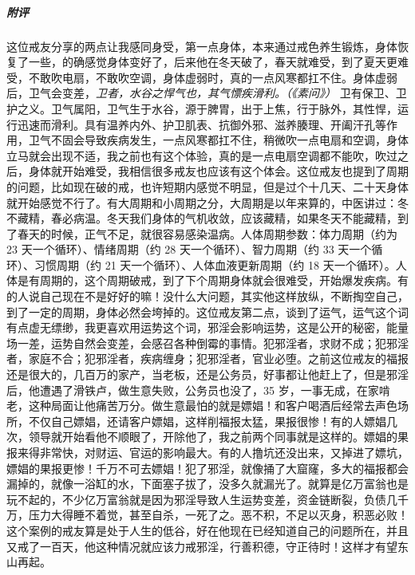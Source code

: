 \begin{case}
    \subparagraph{附评} 这位戒友分享的两点让我感同身受，第一点身体，本来通过戒色养生锻炼，身体恢复了一些，的确感觉身体变好了，后来他在冬天破了，春天就难受，到了夏天更难受，不敢吹电扇，不敢吹空调，身体虚弱时，真的一点风寒都扛不住。身体虚弱后，卫气会变差，\textit{卫者，水谷之悍气也，其气慓疾滑利。（《素问》）} 卫有保卫、卫护之义。卫气属阳，卫气生于水谷，源于脾胃，出于上焦，行于脉外，其性悍，运行迅速而滑利。具有温养内外、护卫肌表、抗御外邪、滋养腠理、开阖汗孔等作用，卫气不固会导致疾病发生，一点风寒都扛不住，稍微吹一点电扇和空调，身体立马就会出现不适，我之前也有这个体验，真的是一点电扇空调都不能吹，吹过之后，身体就开始难受，我相信很多戒友也应该有这个体会。这位戒友也提到了周期的问题，比如现在破的戒，也许短期内感觉不明显，但是过个十几天、二十天身体就开始感觉不行了。有大周期和小周期之分，大周期是以年来算的，中医讲过：冬不藏精，春必病温。冬天我们身体的气机收敛，应该藏精，如果冬天不能藏精，到了春天的时候，正气不足，就很容易感染温病。人体周期参数：体力周期（约为 23 天一个循环）、情绪周期（约 28 天一个循环）、智力周期（约 33 天一个循环）、习惯周期（约 21 天一个循环）、人体血液更新周期（约 18 天一个循环）。人体是有周期的，这个周期破戒，到了下个周期身体就会很难受，开始爆发疾病。有的人说自己现在不是好好的嘛！没什么大问题，其实他这样放纵，不断掏空自己，到了一定的周期，身体必然会垮掉的。这位戒友第二点，谈到了运气，运气这个词有点虚无缥缈，我更喜欢用运势这个词，邪淫会影响运势，这是公开的秘密，能量场一差，运势自然会变差，会感召各种倒霉的事情。犯邪淫者，求财不成；犯邪淫者，家庭不合；犯邪淫者，疾病缠身；犯邪淫者，官业必堕。之前这位戒友的福报还是很大的，几百万的家产，当老板，还是公务员，好事都让他赶上了，但是邪淫后，他遭遇了滑铁卢，做生意失败，公务员也没了，35 岁，一事无成，在家啃老，这种局面让他痛苦万分。做生意最怕的就是嫖娼！和客户喝酒后经常去声色场所，不仅自己嫖娼，还请客户嫖娼，这样削福报太猛，果报很惨！有的人嫖娼几次，领导就开始看他不顺眼了，开除他了，我之前两个同事就是这样的。嫖娼的果报来得非常快，对财运、官运的影响最大。有的人撸坑还没出来，又掉进了嫖坑，嫖娼的果报更惨！千万不可去嫖娼！犯了邪淫，就像捅了大窟窿，多大的福报都会漏掉的，就像一浴缸的水，下面塞子拔了，没多久就漏光了。就算是亿万富翁也是玩不起的，不少亿万富翁就是因为邪淫导致人生运势变差，资金链断裂，负债几千万，压力大得睡不着觉，甚至自杀，一死了之。恶不积，不足以灭身，积恶必败！这个案例的戒友算是处于人生的低谷，好在他现在已经知道自己的问题所在，并且又戒了一百天，他这种情况就应该力戒邪淫，行善积德，守正待时！这样才有望东山再起。
\end{case}

